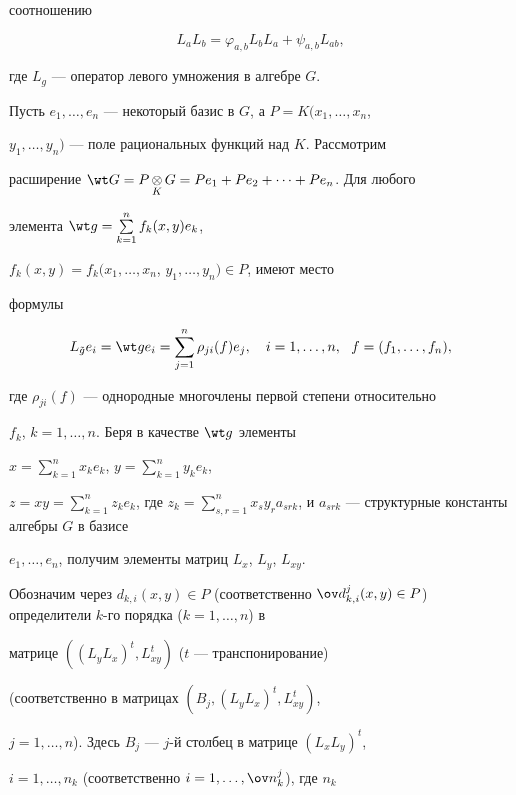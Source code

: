 соотношению 


\begin{equation} L_a L_b=\varphi_{a,b}L_b 


L_a+\psi_{a,b}L_{ab}, 


\end{equation} 


где $L_g$ --- оператор левого умножения в алгебре $G$.  


 


Пусть $e_1,\dotsc,e_n$ --- некоторый базис в $G$, а $P=K(x_1,\dotsc,x_n$, 


$y_1,\dotsc,y_n)$ --- поле рациональных функций над $K$. Рассмотрим 


расширение $\wt G=P\mymat{\otimes}_K G=Pe_1+Pe_2+\dotsb+Pe_n$. Для любого 


элемента $\wt g=\sum\limits^n_{k=1}f_k(x,y)e_k$, 


$f_k(x,y)=f_k(x_1,\dotsc,x_n$, $y_1,\dotsc,y_n)\in P$, имеют место 


формулы  


$$ 


L_{\Tilde g}e_i=\wt g e_i=\sum^n_{j=1}\rho_{ji}(f)e_j,\quad 


i=1,\dotsc,n,\ \ f=(f_1,\dotsc,f_n), 


$$ 


где $\rho_{ji}(f)$ --- однородные многочлены первой степени относительно 


$f_k$, $k=1,\dotsc,n$. Беря в качестве $\wt g$ элементы 


$x=\sum\limits^n_{k=1}x_k e_k$, $y=\sum\limits^n_{k=1}y_k e_k$, 


$z=xy=\sum\limits^n_{k=1}z_k e_k$, где $z_k=\sum\limits^n_{s,r=1}x_s y_r 


a_{srk}$, и $a_{srk}$ --- структурные константы алгебры $G$ в базисе 


$e_1,\dotsc,e_n$, получим элементы матриц $L_x$, $L_y$, $L_{xy}$. 


Обозначим через $d_{k,i}(x,y)\in P$ (соответственно $\ov 


d{}^j_{k,i}(x,y)\in P$) определители $k$-го порядка ($k=1,\dotsc,n$) в 


матрице $((L_y L_x)^t,L^t_{xy})$ ($t$ --- транспонирование) 


(соответственно в матрицах $(B_j,(L_y L_x)^t,L^t_{xy})$, 


$j=1,\dotsc,n$). Здесь $B_j$ --- $j$-й столбец в матрице $(L_x L_y)^t$, 


$i=1,\dotsc,n_k$ (соответственно $i=1,\dotsc,\ov n{}^j_k$), где $n_k$ 


